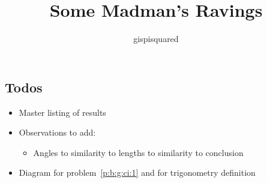 \documentclass{amsbook}
\title{Some Madman's Ravings}
\author{gispisquared}
\numberwithin{section}{chapter}
\begin{document}
\maketitle
\tableofcontents




\appendix


\subsection*{Todos}
\begin{itemize}
  \item Master listing of results
  \item Observations to add:
    \begin{itemize}
      \item Angles to similarity to lengths to similarity to conclusion
    \end{itemize}
  \item Diagram for problem~\ref{p:b:g:ci:1} and for trigonometry definition
\end{itemize}
\end{document}

